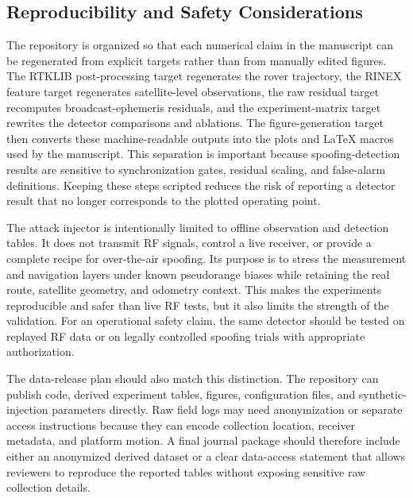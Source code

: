 \documentclass[journal]{IEEEtran}
\begin{document}
\subsection{Reproducibility and Safety Considerations}
The repository is organized so that each numerical claim in the manuscript can be regenerated from explicit targets rather than from manually edited figures.
The RTKLIB post-processing target regenerates the rover trajectory, the RINEX feature target regenerates satellite-level observations, the raw residual target recomputes broadcast-ephemeris residuals, and the experiment-matrix target rewrites the detector comparisons and ablations.
The figure-generation target then converts these machine-readable outputs into the plots and LaTeX macros used by the manuscript.
This separation is important because spoofing-detection results are sensitive to synchronization gates, residual scaling, and false-alarm definitions.
Keeping these steps scripted reduces the risk of reporting a detector result that no longer corresponds to the plotted operating point.

The attack injector is intentionally limited to offline observation and detection tables.
It does not transmit RF signals, control a live receiver, or provide a complete recipe for over-the-air spoofing.
Its purpose is to stress the measurement and navigation layers under known pseudorange biases while retaining the real route, satellite geometry, and odometry context.
This makes the experiments reproducible and safer than live RF tests, but it also limits the strength of the validation.
For an operational safety claim, the same detector should be tested on replayed RF data or on legally controlled spoofing trials with appropriate authorization.

The data-release plan should also match this distinction.
The repository can publish code, derived experiment tables, figures, configuration files, and synthetic-injection parameters directly.
Raw field logs may need anonymization or separate access instructions because they can encode collection location, receiver metadata, and platform motion.
A final journal package should therefore include either an anonymized derived dataset or a clear data-access statement that allows reviewers to reproduce the reported tables without exposing sensitive raw collection details.
\end{document}
